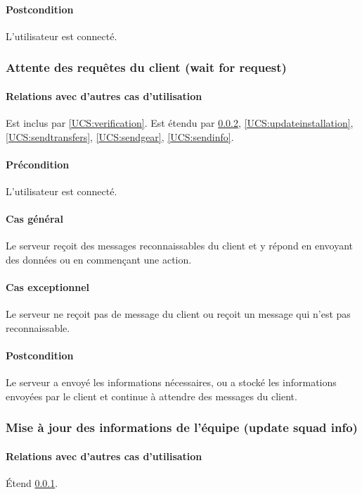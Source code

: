     \paragraph{Postcondition} L'utilisateur est connecté.
    
\subsubsection{Attente des requêtes du client (wait for request)}
	\label{UCS:waitrequest}
	\paragraph{Relations avec d'autres cas d'utilisation} Est inclus par \ref{UCS:verification}.
	Est étendu par \ref{UCS:updatesquad}, \ref{UCS:updateinstallation}, \ref{UCS:sendtransfers}, \ref{UCS:sendgear}, \ref{UCS:sendinfo}.
	\paragraph{Précondition} L'utilisateur est connecté.
    \paragraph{Cas général} Le \gls{serveur} reçoit des messages reconnaissables du \gls{client} et y répond en envoyant des données ou en commençant une action.
    \paragraph{Cas exceptionnel} Le serveur ne reçoit pas de message du client ou reçoit un message qui n'est pas reconnaissable.
    \paragraph{Postcondition} Le serveur a envoyé les informations nécessaires, ou a stocké les informations envoyées par le client et continue à attendre des messages du client.

\subsubsection{Mise à jour des informations de l'équipe (update squad info)}
	\label{UCS:updatesquad}
	\paragraph{Relations avec d'autres cas d'utilisation} \'Etend \ref{UCS:waitrequest}.
